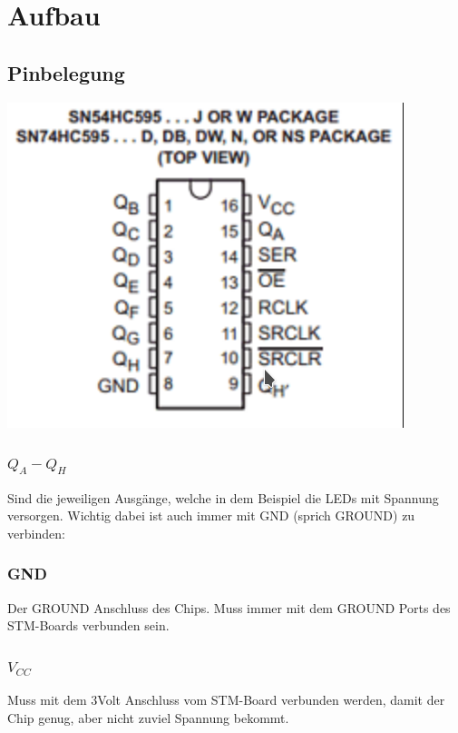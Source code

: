 
\section{Aufbau}
\subsection{Pinbelegung}

\begin{minipage}{\linewidth}
	\centering
	\includegraphics[width=0.8\linewidth]{images/pins}
\end{minipage}

\subsubsection{\(Q_{A} - Q_{H}\)}
Sind die jeweiligen Ausgänge, welche in dem Beispiel die LEDs mit Spannung versorgen. Wichtig dabei ist auch immer mit GND (sprich GROUND) zu verbinden:

\subsubsection{GND}
Der GROUND Anschluss des Chips. Muss immer mit dem GROUND Ports des STM-Boards verbunden sein.

\subsubsection{\(V_{CC}\)}
Muss mit dem 3Volt Anschluss vom STM-Board verbunden werden, damit der Chip genug, aber nicht zuviel Spannung bekommt.

